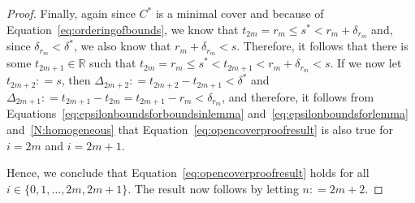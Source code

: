 \documentclass[10pt,a4paper]{paper}
\theoremstyle{definition}
\newcommand{\reals}{\mathbb{R}}
\newcommand{\rateset}{\mathcal{Q}}
\newcommand{\norm}[1]{\left\lVert #1 \right\rVert}
\newcommand{\coloneqq}{:\!=}
\begin{document}
\begin{proof}
Finally, again since $C^*$ is a minimal cover and because of Equation~\eqref{eq:orderingofbounds}, we know that $t_{2m}=r_m\leq s^*<r_m+\delta_{r_m}$ and, since $\delta_{r_m}<\delta^*$, we also know that $r_m+\delta_{r_m}<s$. Therefore, it follows that there is some $t_{2m+1}\in\reals$ such that $t_{2m}=r_m\leq s^*<t_{2m+1}<r_m+\delta_{r_m}<s$. If we now let $t_{2m+2}\coloneqq s$, then $\Delta_{2m+2}\coloneqq t_{2m+2}-t_{2m+1}<\delta^*$ and $\Delta_{2m+1}\coloneqq t_{2m+1}-t_{2m}=t_{2m+1}-r_m<\delta_{r_m}$, and therefore, it follows from Equations~\eqref{eq:epsilonboundsforboundsinlemma} and~\eqref{eq:epsilonboundsforlemma} and~\ref{N:homogeneous} that Equation~\eqref{eq:opencoverproofresult} is also true for $i=2m$ and $i=2m+1$.

Hence, we conclude that Equation~\eqref{eq:opencoverproofresult} holds for all $i\in\{0,1,\dots,2m,2m+1\}$. The result now follows by letting $n\coloneqq2m+2$.
\end{proof}
\end{document}
